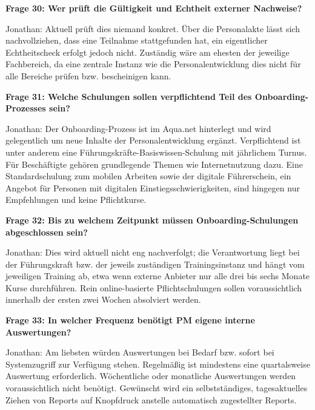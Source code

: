 \documentclass[
    12pt, 
    a4paper,
    ]{scrartcl} %
\begin{document}
\medskip
\textbf{Frage 30: Wer pr\"uft die G\"ultigkeit und Echtheit externer Nachweise?}

Jonathan: Aktuell pr\"uft dies niemand konkret. \"Uber die Personalakte l\"asst sich nachvollziehen, dass eine Teilnahme stattgefunden hat, ein eigentlicher Echtheitscheck erfolgt jedoch nicht. Zust\"andig w\"are am ehesten der jeweilige Fachbereich, da eine zentrale Instanz wie die Personalentwicklung dies nicht f\"ur alle Bereiche pr\"ufen bzw. bescheinigen kann.

\bigskip
{}

\textbf{Frage 31: Welche Schulungen sollen verpflichtend Teil des Onboarding-Prozesses sein?}

Jonathan: Der Onboarding-Prozess ist im Aqua.net hinterlegt und wird gelegentlich um neue Inhalte der Personalentwicklung erg\"anzt. Verpflichtend ist unter anderem eine F\"uhrungskr\"afte-Basiswissen-Schulung mit j\"ahrlichem Turnus. F\"ur Besch\"aftigte geh\"oren grundlegende Themen wie Internetnutzung dazu. Eine Standardschulung zum mobilen Arbeiten sowie der digitale F\"uhrerschein, ein Angebot f\"ur Personen mit digitalen Einstiegsschwierigkeiten, sind hingegen nur Empfehlungen und keine Pflichtkurse.

\medskip
\textbf{Frage 32: Bis zu welchem Zeitpunkt m\"ussen Onboarding-Schulungen abgeschlossen sein?}

Jonathan: Dies wird aktuell nicht eng nachverfolgt; die Verantwortung liegt bei der F\"uhrungskraft bzw. der jeweils zust\"andigen Trainingsinstanz und h\"angt vom jeweiligen Training ab, etwa wenn externe Anbieter nur alle drei bis sechs Monate Kurse durchf\"uhren. Rein online-basierte Pflichtschulungen sollen voraussichtlich innerhalb der ersten zwei Wochen absolviert werden.

\bigskip
{}

\textbf{Frage 33: In welcher Frequenz ben\"otigt PM eigene interne Auswertungen?}

Jonathan: Am liebsten w\"urden Auswertungen bei Bedarf bzw. sofort bei Systemzugriff zur Verf\"ugung stehen. Regelm\"a{\ss}ig ist mindestens eine quartalsweise Auswertung erforderlich. W\"ochentliche oder monatliche Auswertungen werden voraussichtlich nicht ben\"otigt. Gew\"unscht wird ein selbstst\"andiges, tagesaktuelles Ziehen von Reports auf Knopfdruck anstelle automatisch zugestellter Reports.
\end{document}
